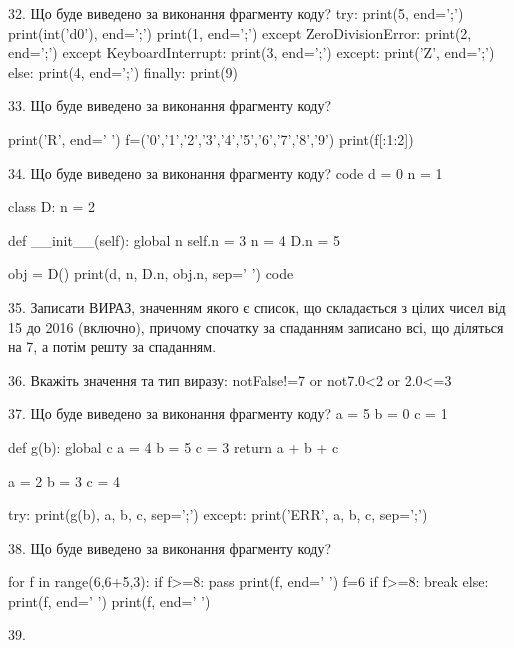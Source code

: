 \documentclass[11pt]{article}
\begin{document}
32. Що буде виведено за виконання фрагменту коду?
try:
    print(5, end=';')
    print(int('d0'), end=';')
    print(1, end=';')
except ZeroDivisionError:
    print(2, end=';')
except KeyboardInterrupt:
    print(3, end=';')
except:
    print('Z', end=';')
else:
    print(4, end=';')
finally:
    print(9)
\vspace{5mm}

33. Що буде виведено за виконання фрагменту коду?

print('R', end=' ')
f=('0','1','2','3','4','5','6','7','8','9')
print(f[:1:2])

\vspace{5mm}

34. Що буде виведено за виконання фрагменту коду?
code
d = 0
n = 1

class D:
    n = 2
    
    def __init__(self):
global n        self.n = 3
        n = 4
        D.n = 5

obj = D()
print(d, n, D.n, obj.n, sep=' ')
code
\vspace{5mm}

35. 
Записати ВИРАЗ, значенням якого є список, що складається з цілих чисел від 15 до 2016 (включно), причому спочатку за спаданням записано всі, що діляться на 7, а потім решту за спаданням.\vspace{5mm}

36. 
Вкажіть значення та тип виразу:
notFalse!=7 or not7.0<2 or 2.0<=3
\vspace{5mm}

37. Що буде виведено за виконання фрагменту коду?
a = 5
b = 0
c = 1

def g(b):
global c    a = 4
    b = 5
    c = 3
    return a + b + c

a = 2
b = 3
c = 4

try:
    print(g(b), a, b, c, sep=';')
except:
    print('ERR', a, b, c, sep=';')
\vspace{5mm}

38. Що буде виведено за виконання фрагменту коду?

for f in range(6,6+5,3):
    if f>=8:
        pass
    print(f, end=' ')
    f=6
    if f>=8:
        break
else:
    print(f, end=' ')
print(f, end=' ')
\vspace{5mm}

39. 
\end{document}
